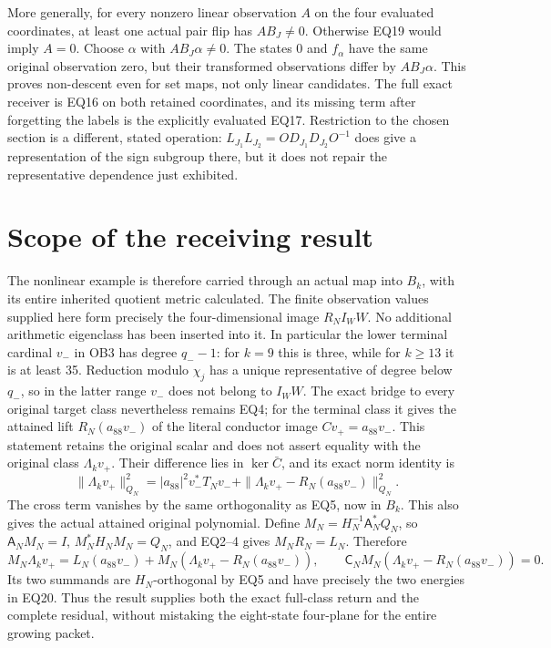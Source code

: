 More generally, for every nonzero linear observation $A$ on the
four evaluated coordinates, at least one actual pair flip has
$AB_J\ne0$. Otherwise EQ19 would imply $A=0$. Choose $\alpha$
with $AB_J\alpha\ne0$. The states $0$ and $f_\alpha$ have the same
original observation zero, but their transformed observations differ
by $AB_J\alpha$. This proves non-descent even for set maps, not only
linear candidates. The full exact receiver is EQ16 on both retained
coordinates, and its missing term after forgetting the labels is
the explicitly evaluated EQ17. Restriction to the chosen section
is a different, stated operation: $L_{J_1}L_{J_2}=OD_{J_1}D_{J_2}O^{-1}$
does give a representation of the sign subgroup there, but it does
not repair the representative dependence just exhibited.

\section{Scope of the receiving result}
The nonlinear example is therefore carried through an actual map
into $B_k$, with its entire inherited quotient metric calculated.
The finite observation values supplied here form precisely the
four-dimensional image $R_NI_W W$. No additional arithmetic
eigenclass has been inserted into it. In particular the lower
terminal cardinal $v_-$ in OB3 has degree $q_--1$: for $k=9$ this
is three, while for $k\ge13$ it is at least 35. Reduction modulo
$\chi_j$ has a unique representative of degree below $q_-$, so
in the latter range $v_-$ does not belong to $I_WW$. The exact
bridge to every original target class nevertheless remains EQ4;
for the terminal class it gives the attained lift
$R_N(a_{88}v_-)$ of the literal conductor image
$Cv_+=a_{88}v_-$. This statement retains the original scalar and
does not assert equality with the original class $\Lambda_kv_+$.
Their difference lies in $\ker\bar C$, and its exact norm identity is
\[
 \|\Lambda_kv_+\|_{Q_N}^2
 =|a_{88}|^2v_-^*T_Nv_-
   +\|\Lambda_kv_+-R_N(a_{88}v_-)\|_{Q_N}^2.                        \tag{EQ20}
\]
The cross term vanishes by the same orthogonality as EQ5, now in
$B_k$. This also gives the actual attained original polynomial.
Define $M_N=H_N^{-1}\mathsf A_N^*Q_N$, so
$\mathsf A_NM_N=I$, $M_N^*H_NM_N=Q_N$, and EQ2--4 gives
$M_NR_N=L_N$. Therefore
\[
 M_N\Lambda_kv_+
 =L_N(a_{88}v_-)+M_N(\Lambda_kv_+-R_N(a_{88}v_-)),\qquad
 \mathsf C_NM_N(\Lambda_kv_+-R_N(a_{88}v_-))=0.                       \tag{EQ21}
\]
Its two summands are $H_N$-orthogonal by EQ5 and have precisely
the two energies in EQ20. Thus the result supplies both the exact
full-class return and the complete residual, without mistaking the
eight-state four-plane for the entire growing packet.

